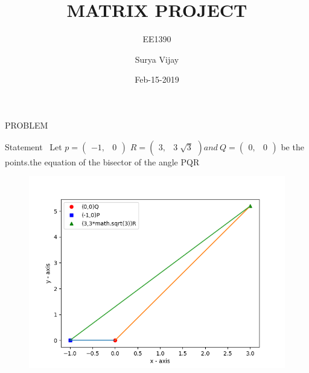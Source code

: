 \documentclass{beamer}
\title{MATRIX PROJECT}
\subtitle{EE1390}
\author{Surya  Vijay}
\date{Feb-15-2019}
\begin{document}
\begin{frame}
\titlepage

\end{frame}

\begin{frame}[t]{PROBLEM }\vspace{10pt}
\begin{block}{Statement}
\ Let $p =   \begin{pmatrix}
    -1  ,& 0
              \end{pmatrix}
$
 $R=  \begin{pmatrix}
    3 ,& 3 \sqrt[]{3}
     \end{pmatrix}
     and \
   Q= \begin{pmatrix}
    0,&0
             
              \end{pmatrix} $
              be the points.the equation of the bisector of the angle PQR
\end{block}
\begin{figure}
   \includegraphics[scale=0.4]{Figure_1.png}
\end{figure}


\end{frame}
\end{document}
